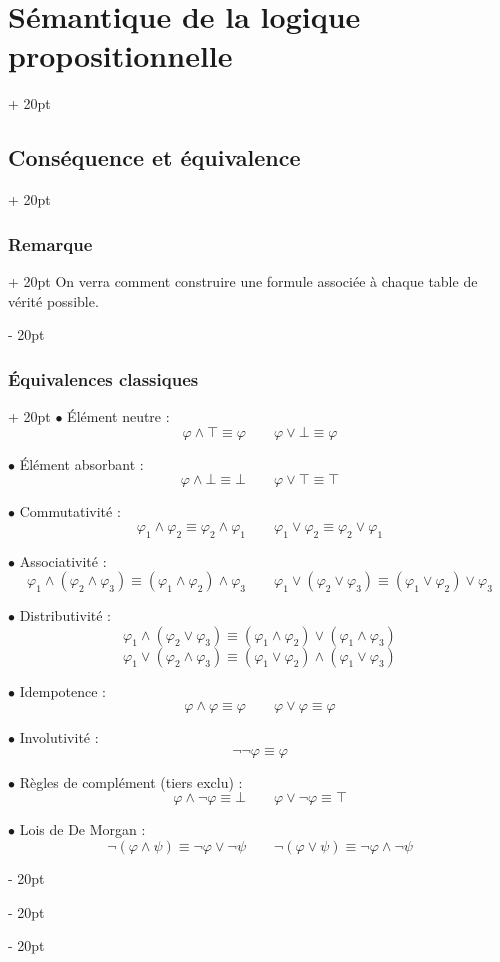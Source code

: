 \documentclass[a4paper, 12pt, twoside]{article}
\newcommand{\ind}[1][20pt]{\advance\leftskip + #1}
\newcommand{\deind}[1][20pt]{\advance\leftskip - #1}
\newenvironment{indt}[2][20pt]{#2 \par \ind[#1]}{\par \deind} %
\begin{document}
\begin{indt}{\section{Sémantique de la logique propositionnelle}}
\begin{indt}{\subsection{Conséquence et équivalence}}
\begin{indt}{\subsubsection{Remarque}}
                On verra comment construire une formule associée à chaque table de vérité possible.
            \end{indt}
            
            \vspace{12pt}
            
            \begin{indt}{\subsubsection{\'Equivalences classiques}}
                $\bullet$ \'Elément neutre :
                    \[ \varphi \wedge \top \equiv \varphi \qquad \varphi \vee \bot \equiv \varphi \]
                
                $\bullet$ \'Elément absorbant :
                    \[ \varphi \wedge \bot \equiv \bot \qquad \varphi \vee \top \equiv \top \]
                
                $\bullet$ Commutativité :
                    \[ \varphi_1 \wedge \varphi_2 \equiv \varphi_2 \wedge \varphi_1 \qquad \varphi_1 \vee \varphi_2 \equiv \varphi_2 \vee \varphi_1 \]
                
                $\bullet$ Associativité :
                    \[ \varphi_1 \wedge (\varphi_2 \wedge \varphi_3) \equiv (\varphi_1 \wedge \varphi_2) \wedge \varphi_3 \qquad \varphi_1 \vee (\varphi_2 \vee \varphi_3) \equiv (\varphi_1 \vee \varphi_2) \vee \varphi_3 \]
                
                $\bullet$ Distributivité :
                    \[ \varphi_1 \wedge (\varphi_2 \vee \varphi_3) \equiv (\varphi_1 \wedge \varphi_2) \vee (\varphi_1 \wedge \varphi_3) \]
                    \[ \varphi_1 \vee (\varphi_2 \wedge \varphi_3) \equiv (\varphi_1 \vee \varphi_2) \wedge (\varphi_1 \vee \varphi_3) \]
                
                $\bullet$ Idempotence :
                    \[ \varphi \wedge \varphi \equiv \varphi \qquad \varphi \vee \varphi \equiv \varphi \]
                
                $\bullet$ Involutivité :
                    \[ \neg \neg \varphi \equiv \varphi \]
                
                $\bullet$ Règles de complément (tiers exclu) :
                    \[ \varphi \wedge \neg \varphi \equiv \bot \qquad \varphi \vee \neg \varphi \equiv \top \]
                
                $\bullet$ Lois de De Morgan :
                    \[ \neg (\varphi \wedge \psi) \equiv \neg \varphi \vee \neg \psi \qquad \neg (\varphi \vee \psi) \equiv \neg \varphi \wedge \neg \psi \]
                

\end{indt}
\end{indt}
\end{indt}
\end{document}
